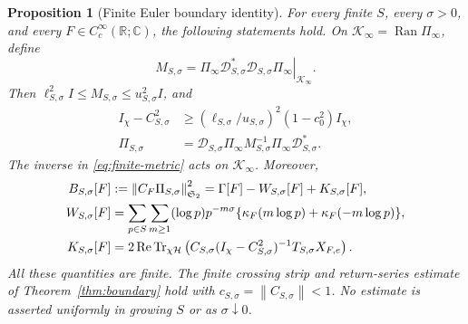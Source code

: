 \documentclass[11pt]{article}
\numberwithin{equation}{section}
\newtheorem{proposition}[theorem]{Proposition}
\theoremstyle{definition}
\theoremstyle{remark}
\newcommand{\HH}{\mathcal H}
\newcommand{\Tr}{\operatorname{Tr}}
\newcommand{\Ran}{\operatorname{Ran}}
\newcommand{\Rea}{\operatorname{Re}}
\newcommand{\Id}{I}
\newcommand{\Stwo}{\mathfrak S_2}
\newcommand{\norm}[1]{\left\lVert #1\right\rVert}
\begin{document}
\begin{proposition}[Finite Euler boundary identity]\label{prop:finite-boundary}
For every finite \(S\), every \(\sigma>0\), and every
\(F\in C_c^\infty(\mathbb R;\mathbb C)\), the following statements hold.
On \(\mathcal K_\infty=\Ran\Pi_\infty\), define
\[
M_{S,\sigma}
=\left.\Pi_\infty \mathcal D_{S,\sigma}^*\mathcal D_{S,\sigma}\Pi_\infty
\right|_{\mathcal K_\infty}.
\]
Then \(\ell_{S,\sigma}^2\Id\le M_{S,\sigma}
\le u_{S,\sigma}^2\Id\), and
\begin{align}
\Id_\chi-C_{S,\sigma}^2
&\ge (\ell_{S,\sigma}/u_{S,\sigma})^2(1-c_0^2)\Id_\chi,
\label{eq:finite-gap}\\
\Pi_{S,\sigma}
&=\mathcal D_{S,\sigma}\Pi_\infty M_{S,\sigma}^{-1}
\Pi_\infty \mathcal D_{S,\sigma}^*.
\label{eq:finite-metric}
\end{align}
The inverse in \eqref{eq:finite-metric} acts on
\(\mathcal K_\infty\). Moreover,
\begin{align}
B_{S,\sigma}[F]
&:=\norm{C_F\Pi_{S,\sigma}}_{\Stwo}^2
=\Gamma[F]-W_{S,\sigma}[F]+K_{S,\sigma}[F],
\label{eq:finite-boundary}\\
W_{S,\sigma}[F]
&=\sum_{p\in S}\sum_{m\ge1}(\log p)p^{-m\sigma}
\{\kappa_F(m\log p)+\kappa_F(-m\log p)\},\notag\\
K_{S,\sigma}[F]
&=2\Rea\Tr_{\chi\HH}\left(
C_{S,\sigma}(\Id_\chi-C_{S,\sigma}^2)^{-1}
T_{S,\sigma}X_{F,e}\right).
\label{eq:finite-correction}
\end{align}
All these quantities are finite. The finite crossing strip and
return-series estimate of Theorem~\ref{thm:boundary} hold with
\(c_{S,\sigma}=\norm{C_{S,\sigma}}<1\). No estimate is asserted
uniformly in growing \(S\) or as \(\sigma\downarrow0\).
\end{proposition}
\end{document}
